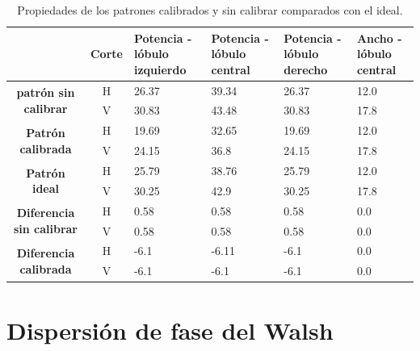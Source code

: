 \begin{table}[H]
  \footnotesize
  \centering
  \begin{tabular}{|c|c|p{2cm}|p{2cm}|p{2cm}|p{2cm}|}
    \cline{2-6}
    \multicolumn{1}{c|}{} & \textbf{Corte} & \textbf{Potencia - lóbulo izquierdo} & \textbf{Potencia - lóbulo central} &
    \textbf{Potencia - lóbulo derecho} & \textbf{Ancho - lóbulo central} \tabularnewline\hline
    \multirow{2}{*}{\textbf{patrón sin calibrar}} & H & 26.37 & 39.34 & 26.37 & 12.0 \tabularnewline\cline{2-6}
     & V & 30.83 & 43.48 & 30.83 & 17.8 \tabularnewline\hline
    \multirow{2}{*}{\textbf{Patrón calibrada}} & H & 19.69 & 32.65 & 19.69 & 12.0 \tabularnewline\cline{2-6}
     & V & 24.15 & 36.8 & 24.15 & 17.8 \tabularnewline\hline
    \multirow{2}{*}{\textbf{Patrón ideal}} & H & 25.79 & 38.76 & 25.79 & 12.0 \tabularnewline\cline{2-6}
     & V & 30.25 & 42.9 & 30.25 & 17.8 \tabularnewline\hline
    \multirow{2}{*}{\textbf{Diferencia sin calibrar}} & H & 0.58 & 0.58 & 0.58 & 0.0\tabularnewline\cline{2-6}
     & V & 0.58 & 0.58 & 0.58 & 0.0 \tabularnewline\hline
    \multirow{2}{*}{\textbf{Diferencia calibrada}} & H & -6.1 & -6.11 & -6.1 & 0.0 \tabularnewline\cline{2-6}
     & V & -6.1 & -6.1 & -6.1 & 0.0 \tabularnewline\hline
  \end{tabular}
  \caption{Propiedades de los patrones calibrados y sin calibrar comparados con el ideal.}
  \label{tab:chirpRepErrClassical10degRow}
\end{table}


\section{Dispersión de fase del Walsh}

